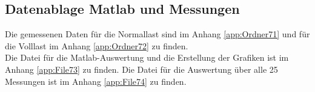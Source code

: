 \subsection{Datenablage Matlab und Messungen}
\label{sub:DatenablageMatlabfile}
Die gemessenen Daten für die Normallast sind im Anhang \ref{app:Ordner71} und für die Volllast im Anhang \ref{app:Ordner72} zu finden.\\
Die Datei für die Matlab-Auswertung und die Erstellung der Grafiken ist im Anhang \ref{app:File73} zu finden. Die Datei für die Auswertung über alle 25 Messungen ist im Anhang \ref{app:File74} zu finden.